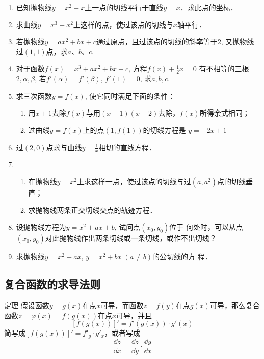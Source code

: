 \begin{ex}
\begin{enumerate}
\item 已知抛物线$y=x^2-x$上一点的切线平行于直线$y=x$．求此点的坐标．
\item 求曲线$y=x^3-x^2$上这样的点，使过该点的切线与$x$轴平行．
\item 若抛物线$y=ax^2+bx+c$通过原点，且过该点的切线的斜率等于2, 又抛物线过$(1, 1)$点，求$a$、$b$、$c$.
\item 对于函数$f(x)=x^3+ax^2+bx+c$, 方程$f(x)+\frac{1}{2}x=0$
有不相等的三根$2,\alpha,\beta$, 若$f'(\alpha)=f'(\beta)$, $f'(1)=0$, 求$a,b,c$.
\item 求三次函数$y=f(x)$, 使它同时满足下面的条件：
\begin{enumerate}
    \item 用$x+1$去除$f(x)$与用$(x-1)(x-2)$去除，$f(x)$所得余式相同；
    \item 过曲线$y=f(x)$上的点$(1,f(1))$的切线方程是
$y=-2x+1$
\end{enumerate}
\item 
过$(2, 0)$点求与曲线$y=\frac{1}{x}$相切的直线方程．
\item 
\begin{enumerate}
\item 在抛物线$y=x^2$上求这样一点，使过该点的切线与过$(a,a^2)$点的切线垂直；
\item 求抛物线两条正交切线交点的轨迹方程．
\end{enumerate}

\item 设抛物线方程为$y=x^2+ax+b$, 试问点$(x_0,y_0)$位于
何处时，可以从点$(x_0,y_0)$对此抛物线作出两条切线或一条切线，或作不出切线？
\item 求抛物线$y=x^2+ax$, $y=x^2+bx\; (a\ne b)$的公切线的方
程．
\end{enumerate} 
\end{ex}

\subsection{复合函数的求导法则}
\begin{blk}
    {定理} 假设函数$y=g(x)$在点$x$可导，而函数$z=f(y)$在点$g(x)$可导，那么复合函数$z=\varphi(x)=f(g(x))$在点$x$可导，并且
\[[f(g(x))]'=f'(g(x))\cdot g'(x)\]
简写成$[f(g(x))]'=f'_g\cdot g'_x$，或者写成
\[\frac{\dd z}{\dd x}=\frac{\dd z}{\dd y}\cdot \frac{\dd y}{\dd x}\]
\end{blk}


